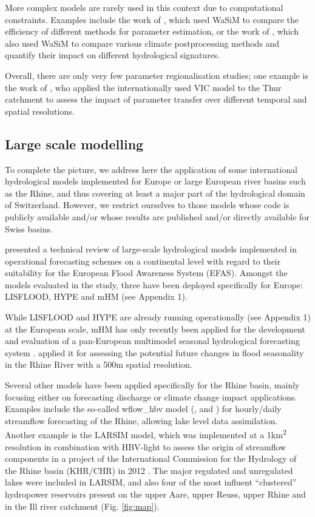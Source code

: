\documentclass[10pt,a4paper]{article}
\begin{document}
More complex models are rarely used in this context due to computational
constraints. Examples include the work of \citet{Cullmann2011}, which
used WaSiM to compare the efficiency of different methods for
parameter estimation, or the work of \citet{Rossler2019}, which also
used WaSiM to compare various climate postprocessing methods and
quantify their impact on different hydrological signatures. 

Overall, there are only very few parameter regionalisation studies; one
example is the work of \citet{Melsen2016}, who applied the
internationally used VIC model to the Thur catchment to assess the
impact of parameter transfer over different temporal and spatial
resolutions.

\subsection{Large scale modelling}
\label{sec:application:largescale}

To complete the picture, we address here the application of some
international hydrological models implemented for Europe or large
European river basins such as the Rhine, and thus covering at least a
major part of the hydrological domain of Switzerland. However, we
restrict ourselves to those models whose code is publicly available
and/or whose results are published and/or directly available for Swiss
basins. 

\citet{Kauffeldt_2016} presented a technical review of large-scale
hydrological models implemented in operational forecasting schemes on a
continental level with regard to their suitability for the European
Flood Awareness System (EFAS). Amongst the models evaluated in the
study, three have been deployed specifically for Europe: LISFLOOD, HYPE
and mHM (see Appendix 1).

While LISFLOOD and HYPE are already running operationally (see Appendix
1) at the European scale, mHM has only recently been applied for the
development and evaluation of a pan-European multimodel seasonal
hydrological forecasting
system \citep{Wanders_2019}. \citet{Rottler2020} applied it for assessing
the potential future changes in flood seasonality in the Rhine River
with a 500m spatial resolution. 

Several other models have been applied specifically for the Rhine basin,
mainly focusing either on forecasting discharge or climate change impact
applications. Examples include the so-called wflow\_hbv model
(\citealp{van_Osnabrugge_2017}, \citealp{van_Osnabrugge_2019} and \citealt{van_Osnabrugge}) for
hourly/daily streamflow forecasting of the Rhine, allowing lake level
data assimilation. Another example is the LARSIM model, which was
implemented at a 1km\textsuperscript{2} resolution in combination with
HBV-light to assess the origin of streamflow components in a project of
the International Commission for the Hydrology of the Rhine basin
(KHR/CHR) in 2012 \citep{m2017}. The major regulated and
unregulated lakes were included in LARSIM, and also four of the most
influent ``clustered'' hydropower reservoirs present on the upper Aare,
upper Reuss, upper Rhine and in the Ill river catchment
(Fig. \ref{fig:map}).
\end{document}
